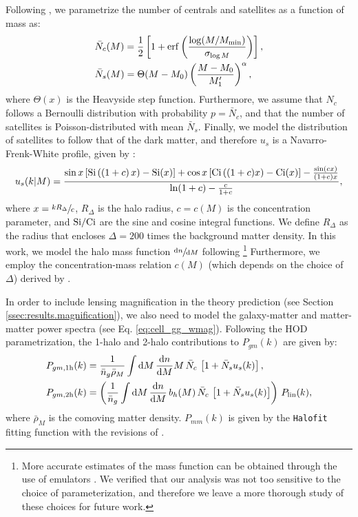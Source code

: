 \documentclass[a4paper,11pt]{article}
\begin{document}
    Following \cite{2011ApJ...736...59Z}, we parametrize the number of centrals and satellites as a function of mass as:
    \begin{align}
      &\bar{N}_c(M)=\frac{1}{2}\left[1+{\rm erf}\left(\frac{\log(M/M_{\rm min})}{\sigma_{\log M}}\right)\right],\\
      &\bar{N}_s(M)=\Theta(M-M_0)\left(\frac{M-M_0}{M_1'}\right)^\alpha,
    \end{align}
    where $\Theta(x)$ is the Heavyside step function. Furthermore, we assume that $N_c$ follows a Bernoulli distribution with probability $p=\bar{N}_c$, and that the number of satellites is Poisson-distributed with mean $\bar{N}_s$. Finally, we model the distribution of satellites to follow that of the dark matter, and therefore $u_s$ is a Navarro-Frenk-White profile, given by \cite{Navarro:1996}:
    \begin{equation}
      u_s(k|M)=\frac{\sin x\left[{\rm Si}\left((1+c)\,x\right)-{\rm Si}(x)\right]+\cos x\left[{\rm Ci}\left((1+c)x\right)-{\rm Ci}(x)\right]-\frac{\sin(cx)}{(1+c)x}}{{\rm ln}(1+c)-\frac{c}{1+c}},
    \end{equation}
    where $x=\sfrac{k R_\Delta}{c}$, $R_\Delta$ is the halo radius, $c=c(M)$ is the concentration parameter, and ${\rm Si}/{\rm Ci}$ are the sine and cosine integral functions. We define $R_\Delta$ as the radius that encloses $\Delta=200$ times the background matter density. In this work, we model the halo mass function $\sfrac{\mathrm{d}n}{\mathrm{d}M}$ following \cite{Tinker:2010}\footnote{More accurate estimates of the mass function can be obtained through the use of emulators \citep{2019ApJ...872...53M}. We verified that our analysis was not too sensitive to the choice of parameterization, and therefore we leave a more thorough study of these choices for future work.} Furthermore, we employ the concentration-mass relation $c(M)$ (which depends on the choice of $\Delta$) derived by \cite{Duffy:2008}.

    In order to include lensing magnification in the theory prediction (see Section \ref{ssec:results.magnification}), we also need to model the galaxy-matter and matter-matter power spectra (see Eq. \ref{eq:cell_gg_wmag}). Following the HOD parametrization, the 1-halo and 2-halo contributions to $P_{gm}(k)$ are given by:
    \begin{align}
      & P_{gm,{\rm 1h}}(k)=\frac{1}{\bar{n}_g\bar{\rho}_M} \int \mathrm{d}M\,\frac{\mathrm{d}n}{\mathrm{d}M} M\,\bar{N}_c\,\left[1+\bar{N}_su_s(k)\right],\\
      & P_{gm,{\rm 2h}}(k)=\left(\frac{1}{\bar{n}_g} \int \mathrm{d}M\,\frac{\mathrm{d}n}{\mathrm{d}M}\,b_h(M)\,\bar{N}_c\,\left[1+\bar{N}_su_s(k)\right]\right)\,P_{\rm lin}(k),
    \end{align}
    where $\bar{\rho}_M$ is the comoving matter density. $P_{mm}(k)$ is given by the {\tt Halofit} fitting function \cite{Smith:2003} with the revisions of \cite{Takahashi:2012}.
\end{document}

